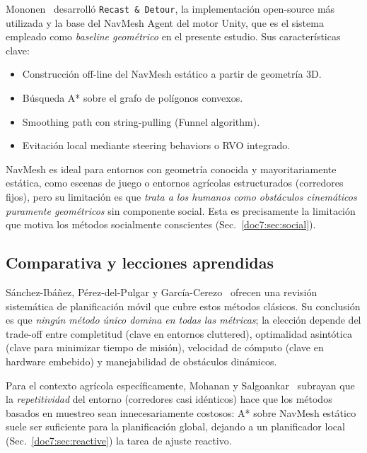\documentclass[12pt,a4paper,oneside]{book}
\begin{document}
Mononen~\cite{Mononen2013} desarrolló \texttt{Recast \& Detour}, la implementación open-source más utilizada y la base del NavMesh Agent del motor Unity, que es el sistema empleado como \emph{baseline geométrico} en el presente estudio. Sus características clave:

\begin{itemize}
    \item Construcción off-line del NavMesh estático a partir de geometría 3D.
    \item Búsqueda A* sobre el grafo de polígonos convexos.
    \item Smoothing path con string-pulling (Funnel algorithm).
    \item Evitación local mediante steering behaviors o RVO integrado.
\end{itemize}

NavMesh es ideal para entornos con geometría conocida y mayoritariamente estática, como escenas de juego o entornos agrícolas estructurados (corredores fijos), pero su limitación es que \emph{trata a los humanos como obstáculos cinemáticos puramente geométricos} sin componente social. Esta es precisamente la limitación que motiva los métodos socialmente conscientes (Sec.~\ref{doc7:sec:social}).

\subsection{Comparativa y lecciones aprendidas}

Sánchez-Ibáñez, Pérez-del-Pulgar y García-Cerezo~\cite{SanchezIbanez2021} ofrecen una revisión sistemática de planificación móvil que cubre estos métodos clásicos. Su conclusión es que \emph{ningún método único domina en todas las métricas}; la elección depende del trade-off entre completitud (clave en entornos cluttered), optimalidad asintótica (clave para minimizar tiempo de misión), velocidad de cómputo (clave en hardware embebido) y manejabilidad de obstáculos dinámicos.

Para el contexto agrícola específicamente, Mohanan y Salgoankar~\cite{Mohanan2018} subrayan que la \emph{repetitividad} del entorno (corredores casi idénticos) hace que los métodos basados en muestreo sean innecesariamente costosos: A* sobre NavMesh estático suele ser suficiente para la planificación global, dejando a un planificador local (Sec.~\ref{doc7:sec:reactive}) la tarea de ajuste reactivo.

\newpage
\end{document}
